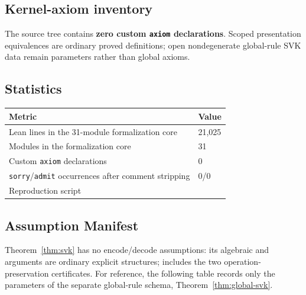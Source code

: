 \documentclass{lmcs}
\theoremstyle{definition}
\theoremstyle{plain}
\theoremstyle{remark}
\begin{document}
\subsection{Kernel-axiom inventory}
\label{tab:kernel-axioms}

The source tree contains \textbf{zero custom \texttt{axiom} declarations}.
Scoped presentation equivalences are ordinary proved definitions; open
nondegenerate global-rule SVK data remain parameters rather than global
axioms.

\subsection{Statistics}

\begin{center}
\setlength{\tabcolsep}{4pt}
\begin{tabular}{@{}L{0.58\textwidth}R{0.34\textwidth}@{}}
\toprule
\textbf{Metric} & \textbf{Value} \\
\midrule
Lean lines in the 31-module formalization core & 21,025 \\
Modules in the formalization core & 31 \\
Custom \texttt{axiom} declarations & 0 \\
\texttt{sorry}/\texttt{admit} occurrences after comment stripping & 0/0 \\
Reproduction script &  \\
\bottomrule
\end{tabular}
\end{center}

\subsection{Assumption Manifest}
\label{sec:assumption-manifest}

Theorem~\ref{thm:svk} has no encode/decode assumptions: its algebraic
 and  arguments are ordinary explicit
structures;  includes the two operation-preservation
certificates.  For reference, the following table records only the parameters of
the separate global-rule schema, Theorem~\ref{thm:global-svk}.
\end{document}
